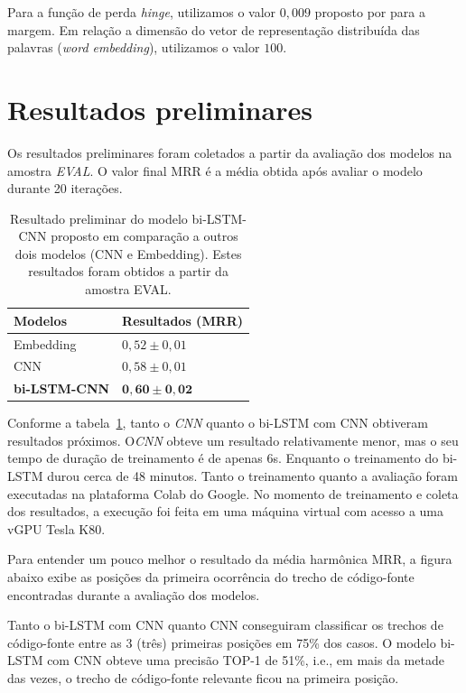 Para a função de perda \textit{hinge}, utilizamos o valor $0,009$ proposto por \cite{feng-2015} para a margem. Em relação a dimensão do vetor de representação distribuída das palavras (\textit{word embedding}), utilizamos o valor $100$.


\section{Resultados preliminares}

Os resultados preliminares foram coletados a partir da avaliação dos modelos na amostra \emph{EVAL}. O valor final MRR é a média obtida após avaliar o modelo durante 20 iterações. 

\begin{table}[h]
\centering
\begin{tabular}{ p{3cm} p{3cm} }
 \hline
 \textbf{Modelos} & \textbf{Resultados (MRR)}\\
 \hline
 Embedding & $0,52 \pm 0,01$\\
 
 CNN & $0,58 \pm 0,01 $ \\
 
 \textbf{bi-LSTM-CNN} & $\bm{0,60} \pm \bm{0,02}$\\
 \hline
\end{tabular}
\caption{Resultado preliminar do modelo bi-LSTM-CNN proposto em comparação a outros dois modelos (CNN e Embedding). Estes resultados foram obtidos a partir da amostra EVAL.}
\label{table:resultados-preliminares}
\end{table}

Conforme a tabela~\ref{table:resultados-preliminares}, tanto o \emph{CNN} quanto o bi-LSTM com CNN obtiveram resultados próximos. O\emph{CNN} obteve um resultado relativamente menor, mas o seu tempo de duração de treinamento é de apenas 6s. Enquanto o treinamento do bi-LSTM durou cerca de 48 minutos. Tanto o treinamento quanto a avaliação foram executadas na plataforma Colab  do Google. No momento de treinamento e coleta dos resultados, a execução foi feita em uma máquina virtual com acesso a uma vGPU  Tesla K80.

Para entender um pouco melhor o resultado da média harmônica MRR, a figura abaixo exibe as posições da primeira ocorrência do trecho de código-fonte encontradas durante a avaliação dos modelos.


Tanto o bi-LSTM com CNN quanto CNN conseguiram classificar os trechos de código-fonte entre as 3 (três) primeiras posições em 75\% dos casos. O modelo bi-LSTM com CNN obteve uma precisão TOP-1 de 51\%, i.e., em mais da metade das vezes, o trecho de código-fonte relevante ficou na primeira posição. 





